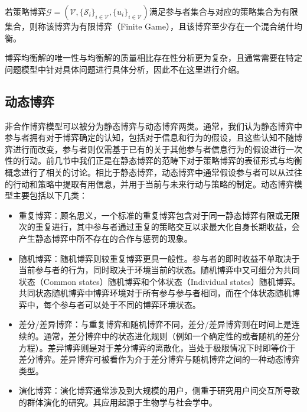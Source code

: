 \begin{thm}[有限博弈中混合纳什均衡的存在性]
若策略博弈$\mathcal{G}=(\mathcal{V},\{\mathcal{S}_i\}_{i\in\mathcal{V}},\{u_i\}_{i\in\mathcal{V}})$满足参与者集合与对应的策略集合为有限集合，则称该博弈为有限博弈（Finite Game），且该博弈至少存在一个混合纳什均衡。
\end{thm}

博弈均衡解的唯一性与均衡解的质量相比存在性分析更为复杂，且通常需要在特定问题模型中针对具体问题进行具体分析，因此不在这里进行介绍。


\subsection{动态博弈}
非合作博弈模型可以被分为静态博弈与动态博弈两类。通常，我们认为静态博弈中参与者拥有对于博弈确定的认知，包括对于信息和行为的假设，且这些认知不随博弈进行而改变，参与者则仅需基于已有的关于其他参与者信息行为的假设进行一次性的行动。前几节中我们正是在静态博弈的范畴下对于策略博弈的表征形式与均衡概念进行了相关的讨论。相比于静态博弈，动态博弈中通常假设参与者可以从过往的行动和策略中提取有用信息，并用于当前与未来行动与策略的制定。动态博弈模型主要包括以下几类：

\begin{itemize}
\item {\heiti 重复博弈：}顾名思义，一个标准的重复博弈包含对于同一静态博弈有限或无限次的重复进行，其中参与者通过重复的策略交互以求最大化自身长期收益，会产生静态博弈中所不存在的合作与惩罚的现象。
\item {\heiti 随机博弈：}随机博弈则较重复博弈更具一般性。参与者的即时收益不单取决于当前参与者的行为，同时取决于环境当前的状态。随机博弈中又可细分为共同状态（Common states）随机博弈和个体状态（Individual states）随机博弈。共同状态随机博弈中博弈环境对于所有参与参与者相同，而在个体状态随机博弈中，每个参与者可以处于不同的博弈环境状态。
\item {\heiti 差分/差异博弈：}与重复博弈和随机博弈不同，差分/差异博弈则在时间上是连续的。通常，差分博弈中的状态进化规则（例如一个确定性的或者随机的差分方程）。差异博弈则是对于差分博弈的离散化，当处于极限情况下时即等价于差分博弈。差异博弈可被看作为介于差分博弈与随机博弈之间的一种动态博弈类型。
\item {\heiti 演化博弈：}演化博弈通常涉及到大规模的用户，侧重于研究用户间交互所导致的群体演化的研究。其应用起源于生物学与社会学中。
\end{itemize}

